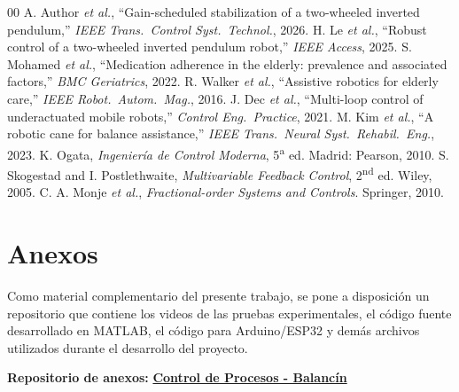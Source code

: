 \documentclass[conference]{IEEEtran}
\begin{document}
\begin{thebibliography}{00}
 A. Author \textit{et al.}, ``Gain-scheduled stabilization of a two-wheeled inverted pendulum,'' \textit{IEEE Trans.\ Control Syst.\ Technol.}, 2026.
 H. Le \textit{et al.}, ``Robust control of a two-wheeled inverted pendulum robot,'' \textit{IEEE Access}, 2025.
 S. Mohamed \textit{et al.}, ``Medication adherence in the elderly: prevalence and associated factors,'' \textit{BMC Geriatrics}, 2022.
 R. Walker \textit{et al.}, ``Assistive robotics for elderly care,'' \textit{IEEE Robot.\ Autom.\ Mag.}, 2016.
 J. Dec \textit{et al.}, ``Multi-loop control of underactuated mobile robots,'' \textit{Control Eng.\ Practice}, 2021.
 M. Kim \textit{et al.}, ``A robotic cane for balance assistance,'' \textit{IEEE Trans.\ Neural Syst.\ Rehabil.\ Eng.}, 2023.
 K. Ogata, \textit{Ingenier\'ia de Control Moderna}, 5\textsuperscript{a} ed. Madrid: Pearson, 2010.
 S. Skogestad and I. Postlethwaite, \textit{Multivariable Feedback Control}, 2\textsuperscript{nd} ed. Wiley, 2005.
 C. A. Monje \textit{et al.}, \textit{Fractional-order Systems and Controls}. Springer, 2010.
\end{thebibliography}

\section*{Anexos}
Como material complementario del presente trabajo, se pone a disposición un repositorio que contiene los videos de las pruebas experimentales, el código fuente desarrollado en MATLAB, el código para Arduino/ESP32 y demás archivos utilizados durante el desarrollo del proyecto.

\noindent\textbf{Repositorio de anexos:}
\href{https://drive.google.com/drive/folders/1kSB1t4HDESmoNqEtBwbotak70owNwRPx?usp=sharing}{\textbf{Control de Procesos - Balancín}}
\end{document}
